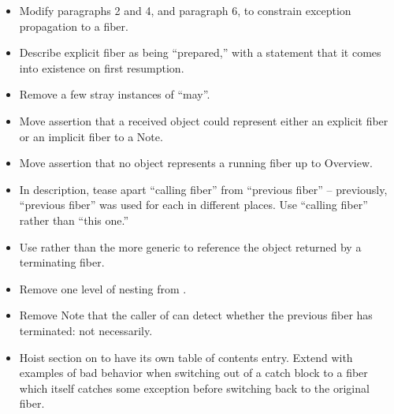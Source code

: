 \begin{itemize}
    \item Modify  paragraphs 2 and 4, and 
          paragraph 6, to constrain exception propagation to a fiber.
    \item Describe explicit fiber as being ``prepared,'' with a statement that
          it comes into existence on first resumption.
    \item Remove a few stray instances of ``may''.
    \item Move assertion that a received \fiber object could represent either
          an explicit fiber or an implicit fiber to a Note.
    \item Move assertion that no \fiber object represents a running fiber up
          to Overview.
    \item In \resumewith description, tease apart ``calling fiber'' from
          ``previous fiber'' -- previously, ``previous fiber'' was used for
          each in different places. Use ``calling fiber'' rather than ``this one.''
    \item Use  rather than the more generic 
          to reference the \fiber object returned by a terminating fiber.
    \item Remove one level of nesting from \resumewith \except.
    \item Remove Note that the caller of \resumewith can detect whether the
          previous fiber has terminated: not necessarily.
    \item Hoist section on \exfns to have its own table of contents entry.
          Extend with examples of bad behavior when switching out of a catch
          block to a fiber which itself catches some exception before
          switching back to the original fiber.
\end{itemize}


